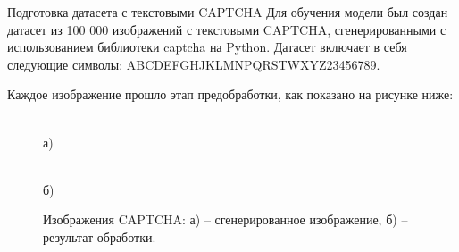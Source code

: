 \documentclass[12pt,a4paper,mathserif]{beamer}
\begin{document}
\begin{frame}{\large Подготовка датасета с текстовыми CAPTCHA}
    \setlength{\parindent}{0.5cm}
    Для обучения модели был создан датасет из 100 000 изображений с текстовыми 
    CAPTCHA, сгенерированными с использованием библиотеки captcha на Python. 
    Датасет включает в себя следующие символы: ABCDEFGHJKLMNPQRSTWXYZ23456789.

    Каждое изображение прошло этап предобработки, как показано на рисунке ниже:

    \begin{figure}[H]
        \centering
        \begin{minipage}[h]{0.45\linewidth}
            \\ а)
        \end{minipage}
        \begin{minipage}[h]{0.45\linewidth}
            \\ б)
        \end{minipage}
        \caption{\centering Изображения CAPTCHA: а) -- сгенерированное изображение, б) -- результат обработки.}
    \end{figure}
\end{frame}
\end{document}
